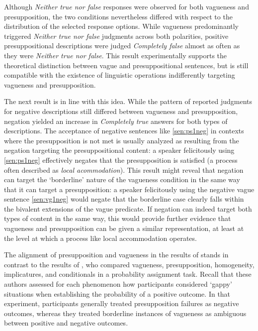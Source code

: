 \documentclass[12pt, letterpaper]{article}
\begin{document}
{Although \textit{Neither true nor false} responses were observed for both vagueness and presupposition, the two conditions nevertheless differed with respect to the distribution of the selected response options. While vagueness predominantly triggered \textit{Neither true nor false} judgments across both polarities, positive presuppositional descriptions were judged \textit{Completely false} almost as often as they were \textit{Neither true nor false}. This result experimentally supports the theoretical distinction between vague and presuppositional sentences, but is still compatible with the existence of linguistic operations indifferently targeting vagueness and presupposition.

The next result is in line with this idea. While the pattern of reported judgments for negative descriptions still differed between vagueness and presupposition, negation yielded an increase in \textit{Completely true} answers for both types of descriptions. The acceptance of negative sentences like \ref{sen:ps1neg} in contexts where the presupposition is not met is usually analyzed as resulting from the negation targeting the presuppositional content: a speaker felicitously using \ref{sen:ps1neg} effectively negates that the presupposition is satisfied (a process often described as \textit{local acommodation}). This result might reveal that negation can target the `borderline' nature of the vagueness condition in the same way that it can target a presupposition: a speaker felicitously using the negative vague sentence \ref{sen:vg1neg} would negate that the borderline case clearly falls within the bivalent extensions of the vague predicate. If negation can indeed target both types of content in the same way, this would provide further evidence that vagueness and presupposition can be given a similar representation, at least at the level at which a process like local accommodation operates. 

The alignment of presupposition and vagueness in the results of \cite{Zehr:2014} stands in contrast to the results of \cite{Cremers:2015a}, who compared vagueness, presupposition, homogeneity, implicatures, and conditionals in a probability assignment task. Recall that these authors assessed for each phenomenon how participants considered `gappy' situations when establishing the probability of a positive outcome. In that experiment, participants generally treated presupposition failures as negative outcomes, whereas they treated borderline instances of vagueness as ambiguous between positive and negative outcomes.

}
\end{document}
